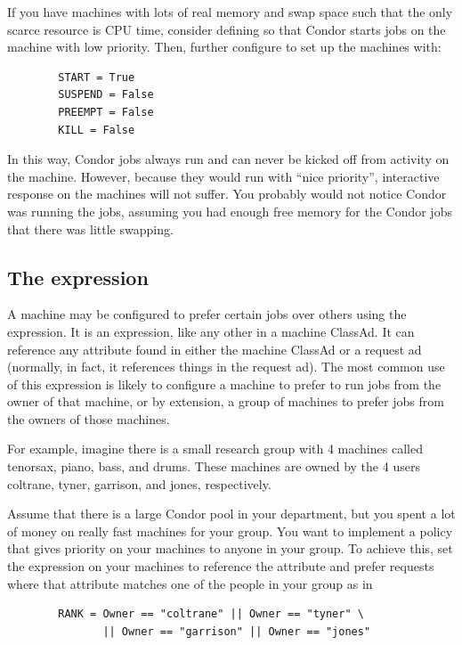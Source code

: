 \Note If you have machines with lots of real memory and swap space such
that the only scarce resource is CPU time, consider
defining  
so that Condor starts jobs on the machine with low priority.
Then, further configure to set up the machines with:
\begin{verbatim}
        START = True
        SUSPEND = False
        PREEMPT = False
        KILL = False
\end{verbatim}
In this way, Condor jobs always run and can never be kicked off
from activity on the machine. 
However, because they would run with ``nice priority'', interactive 
response on the machines will not suffer.
You probably would not notice Condor was running the jobs, 
assuming you had enough free memory for the Condor jobs that there
was little swapping.

\subsection{\label{sec:Rank-Expression}
The  expression}

A machine may be configured to prefer certain jobs over others
using the  expression.
It is an
expression, like any other in a machine ClassAd.
It can
reference any attribute found in either the machine ClassAd or a
request ad (normally, in fact, it references things in the request
ad).
The most common use of this expression is likely to configure a
machine to prefer to run jobs from the owner of that machine, or by
extension, a group of machines to prefer jobs from the owners of those
machines.

For example, imagine there is a small research group with 4 machines
called tenorsax, piano, bass, and drums.
These machines are owned by the 4 users
coltrane, tyner, garrison, and jones,
respectively.  

Assume that there is a large Condor pool in your department,
but you spent a lot of money on really fast machines for your group.
You want to implement a policy
that gives priority on your machines to
anyone in your group.
To achieve this, set the 
expression on your machines to reference the  attribute and
prefer requests where that attribute matches one of the people in your
group as in
\begin{verbatim}
        RANK = Owner == "coltrane" || Owner == "tyner" \
               || Owner == "garrison" || Owner == "jones"
\end{verbatim}

